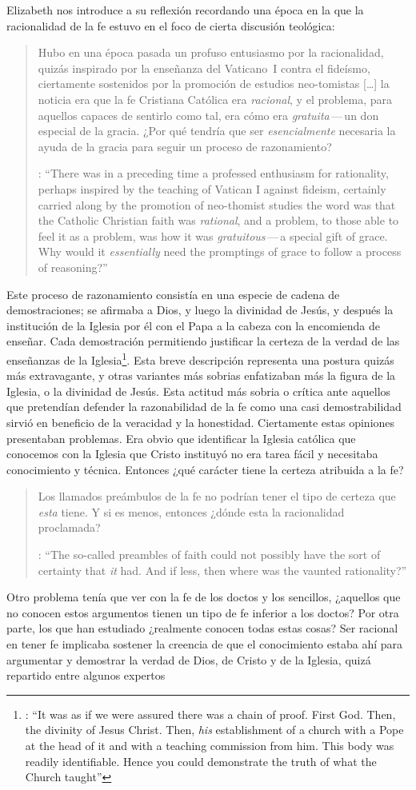 Elizabeth nos introduce a su reflexión recordando una época en la que la racionalidad de la fe estuvo en el foco de cierta discusión teológica: \blockquote[{\cite[113]{anscombe1981erp:faith}}: \enquote{There was in a preceding time a professed enthusiasm for rationality, perhaps inspired by the teaching of Vatican I against fideism, certainly carried along by the promotion of neo-thomist studies \textelp{} the word was that the Catholic Christian faith was \emph{rational}, and a problem, to those able to feel it as a problem, was how it was \emph{gratuitous}\,---\,a special gift of grace. Why would it \emph{essentially} need the promptings of grace to follow a process of reasoning?}]{Hubo en una época pasada un profuso entusiasmo por la racionalidad, quizás inspirado por la enseñanza del Vaticano~I contra el fideísmo, ciertamente sostenidos por la promoción de estudios neo-tomistas [\ldots] la noticia era que la fe Cristiana Católica era \emph{racional}, y el problema, para aquellos capaces de sentirlo como tal, era cómo era \emph{gratuita}\,---\,un don especial de la gracia. ¿Por qué tendría que ser \emph{esencialmente} necesaria la ayuda de la gracia para seguir un proceso de razonamiento?} Este proceso de razonamiento consistía en una especie de cadena de demostraciones; se afirmaba a Dios, y luego la divinidad de Jesús, y después la institución de la Iglesia por él con el Papa a la cabeza con la encomienda de enseñar. Cada demostración permitiendo justificar la certeza de la verdad de las enseñanzas de la Iglesia\footnote{\cite[Cf.~][12]{anscombe1981erp:faith}: \enquote{It was as if we were assured there was a chain of proof. First God. Then, the divinity of Jesus Christ. Then, \emph{his} establishment of a church with a Pope at the head of it and with a teaching commission from him. This body was readily identifiable. Hence you could demonstrate the truth of what the Church taught}}. Esta breve descripción representa una postura quizás más extravagante, y otras variantes más sobrias enfatizaban más la figura de la Iglesia, o la divinidad de Jesús. Esta actitud más sobria o crítica ante aquellos que pretendían defender la razonabilidad de la fe como una casi demostrabilidad sirvió en beneficio de la veracidad y la honestidad. Ciertamente estas opiniones presentaban problemas. Era obvio que identificar la Iglesia católica que conocemos con la Iglesia que Cristo instituyó no era tarea fácil y necesitaba conocimiento y técnica. Entonces ¿qué carácter tiene la certeza atribuida a la fe? \blockquote[{\cite[114]{anscombe1981erp:faith}}: \enquote{The so-called preambles of faith could not possibly have the sort of certainty that \emph{it} had. And if less, then where was the vaunted rationality?}]{Los llamados preámbulos de la fe no podrían tener el tipo de certeza que \emph{esta} tiene. Y si es menos, entonces ¿dónde esta la racionalidad proclamada?}. Otro problema tenía que ver con la fe de los doctos y los sencillos, ¿aquellos que no conocen estos argumentos tienen un tipo de fe inferior a los doctos? Por otra parte, los que han estudiado ¿realmente conocen todas estas cosas? Ser racional en tener fe implicaba sostener la creencia de que el conocimiento estaba ahí para argumentar y demostrar la verdad de Dios, de Cristo y de la Iglesia, quizá repartido entre algunos expertos 